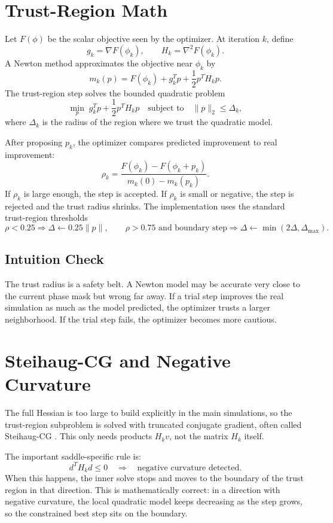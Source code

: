 \documentclass[11pt]{article}
\begin{document}
\section{Trust-Region Math}

Let \(F(\phi)\) be the scalar objective seen by the optimizer. At iteration
\(k\), define
\[
    g_k=\nabla F(\phi_k),
    \qquad
    H_k=\nabla^2 F(\phi_k).
\]
A Newton method approximates the objective near \(\phi_k\) by
\[
    m_k(p)=F(\phi_k)+g_k^T p+\frac{1}{2}p^T H_k p.
\]
The trust-region step solves the bounded quadratic problem
\[
    \min_p \; g_k^T p+\frac{1}{2}p^T H_k p
    \quad
    \text{subject to}
    \quad
    \|p\|_2 \leq \Delta_k,
\]
where \(\Delta_k\) is the radius of the region where we trust the quadratic
model.

After proposing \(p_k\), the optimizer compares predicted improvement to real
improvement:
\[
    \rho_k
    =
    \frac{F(\phi_k)-F(\phi_k+p_k)}
    {m_k(0)-m_k(p_k)}.
\]
If \(\rho_k\) is large enough, the step is accepted. If \(\rho_k\) is small or
negative, the step is rejected and the trust radius shrinks. The implementation
uses the standard trust-region thresholds
\[
    \rho < 0.25 \Rightarrow \Delta \leftarrow 0.25\|p\|,
    \qquad
    \rho > 0.75 \text{ and boundary step} \Rightarrow
    \Delta \leftarrow \min(2\Delta,\Delta_{\max}).
\]

\subsection*{Intuition Check}

The trust radius is a safety belt. A Newton model may be accurate very close
to the current phase mask but wrong far away. If a trial step improves the
real simulation as much as the model predicted, the optimizer trusts a larger
neighborhood. If the trial step fails, the optimizer becomes more cautious.

\section{Steihaug-CG and Negative Curvature}

The full Hessian is too large to build explicitly in the main simulations, so
the trust-region subproblem is solved with truncated conjugate gradient, often
called Steihaug-CG \cite{steihaug1983,nocedal2006}. This only needs products
\(H_k v\), not the matrix \(H_k\) itself.

The important saddle-specific rule is:
\[
    d^T H_k d \leq 0
    \quad
    \Rightarrow
    \quad
    \text{negative curvature detected.}
\]
When this happens, the inner solve stops and moves to the boundary of the
trust region in that direction. This is mathematically correct: in a direction
with negative curvature, the local quadratic model keeps decreasing as the
step grows, so the constrained best step sits on the boundary.
\end{document}
